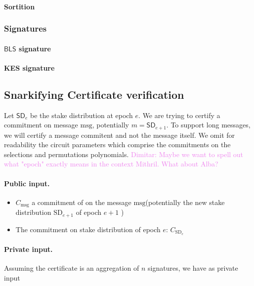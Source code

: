 \documentclass{article}
\newcommand{\m}{\ensuremath{\textrm{msg}}\xspace}
\newcommand{\BLS}{\ensuremath{\mathsf{BLS}}\xspace}
\newcommand{\dimitar}[1]{\textcolor{violet}{Dimitar: #1}\xspace}
\begin{document}
\paragraph{Sortition}

%
\subsubsection{Signatures}
\paragraph{\BLS signature}
\paragraph{KES signature}

%
%
\subsection{Snarkifying Certificate verification}
\label{subsec:SnarkCert}

Let $\textsf{SD}_e$ be the stake distribution at epoch $e$. We are trying to certify a commitment on message \m, potentially $m = \textsf{SD}_{e+1}$. To support long messages, we will certify a message commitent and not the message itself.
We omit for readability the circuit parameters which comprise the commitments on the selections and permutations polynomials.
\dimitar{Maybe we want to spell out what "epoch" exactly means in the context Mithril. What about Alba?}

\paragraph{Public input.}
\begin{itemize}
    \item $C_\m$ a commitment of on the message \m (potentially the new stake distribution $\text{SD}_{e+1}$ of epoch $e+1$ )
    \item The commitment on stake distribution of epoch $e$: $C_{\text{SD}_e}$
\end{itemize}

\paragraph{Private input.}
Assuming the certificate is an aggregation of $n$ signatures, we have as private input
\end{document}
